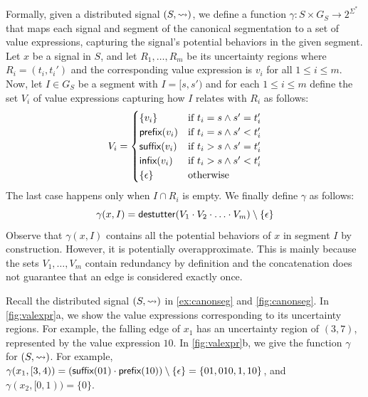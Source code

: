 Formally, given a distributed signal $(S,{\rightsquigarrow})$, we define a function $\gamma : S \times G_S \to 2^{\Sigma^*}$ that maps each signal and segment of the canonical segmentation to a set of value expressions, capturing the signal's potential behaviors in the given segment.
Let $x$ be a signal in $S$, and let $R_1, \ldots, R_m$ be its uncertainty regions where $R_i = (t_i, t_i')$ and the corresponding value expression is $v_i$ for all $1 \leq i \leq m$.
Now, let $I \in G_S$ be a segment with $I = [s, s')$ and for each $1 \leq i \leq m$ define the set $V_i$ of value expressions capturing how $I$ relates with $R_i$ as follows:
%
\small
\begin{equation} \label{eq:valexprset}
	V_i = 
	\begin{cases}
		\{v_i\} & \text{if } t_i = s \land s' = t_i' \\
		\textsf{prefix}(v_i) & \text{if } t_i = s \land s' < t_i' \\
		\textsf{suffix}(v_i) & \text{if } t_i > s \land s' = t_i' \\
		\textsf{infix}(v_i) & \text{if } t_i > s \land s' < t_i' \\
		\{\epsilon\} & \text{otherwise}
	\end{cases}
\end{equation}
\normalsize
The last case happens only when $I \cap R_i$ is 
empty.
We finally define $\gamma$ as follows:
\[ \gamma(x,I) = \mathsf{destutter}(V_1 \cdot V_2 \cdot \ldots \cdot V_m) \setminus \{\epsilon\} \]
Observe that $\gamma(x,I)$ contains all the potential behaviors of $x$ in segment $I$ by construction.
However, it is potentially overapproximate.
This is mainly because the sets $V_1, \ldots, V_m$ contain redundancy by definition and the concatenation does not guarantee that an edge is considered exactly once.

\begin{example} \label{ex:valexpr}
	Recall the distributed signal $(S, {\rightsquigarrow})$ in \cref{ex:canonseg} and \cref{fig:canonseg}.
	In \cref{fig:valexpr}a, we show the value expressions corresponding to its uncertainty regions.
	For example, the falling edge of $x_1$ has an uncertainty region of $(3,7)$, represented by the value expression $10$.
	In \cref{fig:valexpr}b, we give the function $\gamma$ for $(S, {\rightsquigarrow})$.
	For example, $\gamma(x_1, [3,4)) = (\textsf{suffix}(01) \cdot \textsf{prefix}(10)) \setminus \{\epsilon\} = \{ 01, 010, 1, 10\}$, and 
	$\gamma(x_2, [0,1)) = \{0\}$.
\end{example}




